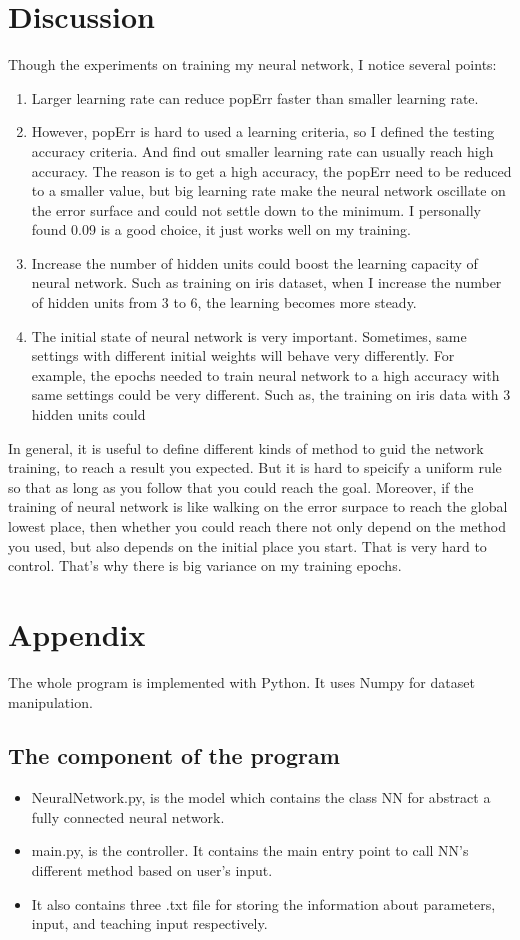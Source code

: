 \documentclass[11pt]{article}
\begin{document}
\section{Discussion}
\label{sec-4}
Though the experiments on training my neural network, I notice several points:
\begin{enumerate}
\item Larger learning rate can reduce popErr faster than smaller learning rate.
\item However, popErr is hard to used a learning criteria, so I defined the testing accuracy criteria. And find out smaller learning rate can usually reach high accuracy. The reason is to get a high accuracy, the popErr need to be reduced to a smaller value, but big learning rate make the neural network oscillate on the error surface and could not settle down to the minimum. I personally found 0.09 is a good choice, it just works well on my training.
\item Increase the number of hidden units could boost the learning capacity of neural network. Such as training on iris dataset, when I increase the number of hidden units from 3 to 6, the learning becomes more steady.
\item The initial state of neural network is very important. Sometimes, same settings with different initial weights will behave very differently. For example, the epochs needed to train neural network to a high accuracy with same settings could be very different. Such as, the training on iris data with 3 hidden units could
\end{enumerate}


In general, it is useful to define different kinds of method to guid the network training, to reach a result you expected. But it is hard to speicify a uniform rule so that as long as you follow that you could reach the goal. Moreover, if the training of neural network is like walking on the error surpace to reach the global lowest place, then whether you could reach there not only depend on the method you used, but also depends on the initial place you start. That is very hard to control. That's why there is big variance on my training epochs.

\section{Appendix}
\label{sec-5}
The whole program is implemented with Python. It uses Numpy for dataset manipulation.
\subsection{The component of the program}
\label{sec-5-1}
\begin{itemize}
\item NeuralNetwork.py, is the model which contains the class NN for abstract a fully connected neural network.
\item main.py, is the controller. It contains the main entry point to call NN's different method based on user's input.
\item It also contains three .txt file for storing the information about parameters, input, and teaching input respectively.
\end{itemize}
\end{document}
